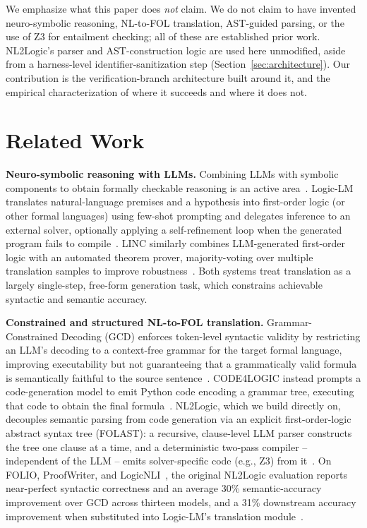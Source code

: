 \documentclass[conference]{IEEEtran}
\begin{document}
We emphasize what this paper does \emph{not} claim. We do not claim to have invented neuro-symbolic reasoning, NL-to-FOL translation, AST-guided parsing, or the use of Z3 for entailment checking; all of these are established prior work. NL2Logic's parser and AST-construction logic are used here unmodified, aside from a harness-level identifier-sanitization step (Section~\ref{sec:architecture}). Our contribution is the verification-branch architecture built around it, and the empirical characterization of where it succeeds and where it does not.

\section{Related Work}

\textbf{Neuro-symbolic reasoning with LLMs.} Combining LLMs with symbolic components to obtain formally checkable reasoning is an active area~\cite{wang2024neurosymbolic}. Logic-LM translates natural-language premises and a hypothesis into first-order logic (or other formal languages) using few-shot prompting and delegates inference to an external solver, optionally applying a self-refinement loop when the generated program fails to compile~\cite{pan2023logiclm}. LINC similarly combines LLM-generated first-order logic with an automated theorem prover, majority-voting over multiple translation samples to improve robustness~\cite{olausson2023linc}. Both systems treat translation as a largely single-step, free-form generation task, which constrains achievable syntactic and semantic accuracy.

\textbf{Constrained and structured NL-to-FOL translation.} Grammar-Constrained Decoding (GCD) enforces token-level syntactic validity by restricting an LLM's decoding to a context-free grammar for the target formal language, improving executability but not guaranteeing that a grammatically valid formula is semantically faithful to the source sentence~\cite{raspanti2025gcd}. CODE4LOGIC instead prompts a code-generation model to emit Python code encoding a grammar tree, executing that code to obtain the final formula~\cite{liu2025code4logic}. NL2Logic, which we build directly on, decouples semantic parsing from code generation via an explicit first-order-logic abstract syntax tree (FOLAST): a recursive, clause-level LLM parser constructs the tree one clause at a time, and a deterministic two-pass compiler -- independent of the LLM -- emits solver-specific code (e.g., Z3) from it~\cite{putra2026nl2logic}. On FOLIO, ProofWriter, and LogicNLI~\cite{tian2021logicnli}, the original NL2Logic evaluation reports near-perfect syntactic correctness and an average 30\% semantic-accuracy improvement over GCD across thirteen models, and a 31\% downstream accuracy improvement when substituted into Logic-LM's translation module~\cite{putra2026nl2logic}.
\end{document}
